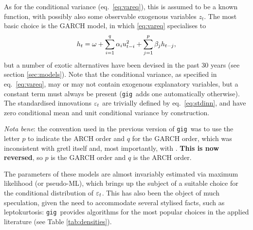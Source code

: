 \documentclass[a4paper,11pt]{article}
\newcommand{\app}[1]{\textsf{#1}}
\newcommand{\tip}[1]{\par\vspace{4pt}
 \ding{43} {\small \sffamily #1}\par\smallskip}
\newcommand{\stdu}{\ensuremath \varepsilon}
\newcommand{\uhat}{\ensuremath u}
\newcommand{\gig}{\texttt{gig}}
\begin{document}
As for the conditional variance (eq.~\ref{eq:vareq}), this is assumed
to be a known function, with possibly also some observable exogenous
variables $z_t$. The most basic choice is the GARCH model, in which
\eqref{eq:vareq} specialises to
\[
  h_t = \omega +  \sum_{i=1}^q \alpha_i \uhat_{t-i}^2 + 
  \sum_{j=1}^p\beta_j h_{t-j} ,
\]
but a number of exotic alternatives have been devised in the past 30
years (see section \ref{sec:models}). Note that the conditional
variance, as specified in eq.~\eqref{eq:vareq}, may or may not contain
exogenous explanatory variables, but a constant term must always be
present (\gig\ adds one automatically otherwise). The
standardised innovations $\stdu_t$ are trivially defined by
eq.~\eqref{eq:stdinn}, and have zero conditional mean and unit
conditional variance by construction.

\tip{\emph{Nota bene}: the convention used in the previous version of \gig\
was to use the letter $p$ to indicate the ARCH order and $q$ for the
GARCH order, which was inconsistent with \app{gretl} itself and, most
importantly, with \cite{Bollerslev-86}. \textbf{This is now reversed},
so $p$ is the GARCH order and $q$ is the ARCH order.}


The parameters of these models are almost invariably estimated via
maximum likelihood (or pseudo-ML), which brings up the subject of a
suitable choice for the conditional distribution of $\stdu_t$.  This has
also been the object of much speculation, given the need to
accommodate several stylised facts, such as leptokurtosis:
\gig\ provides algorithms for the most popular choices in the
applied literature (see Table \ref{tab:densities}).
\end{document}
